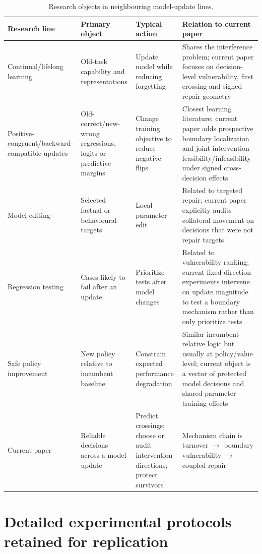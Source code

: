 \documentclass[11pt,letterpaper]{article}
\theoremstyle{plain}
\newcommand{\1}{\mathbf 1}
\begin{document}
\begin{table}[H]\centering\small
\caption{Research objects in neighbouring model-update lines.}\label{tab:s_neighbor_methods}
\begin{tabularx}{\textwidth}{p{}p{}p{}X}
\toprule
Research line & Primary object & Typical action & Relation to current paper\\
\midrule
Continual/lifelong learning & Old-task capability and representations & Update model while reducing forgetting & Shares the interference problem; current paper focuses on decision-level vulnerability, first crossing and signed repair geometry\\
Positive-congruent/backward-compatible updates & Old-correct/new-wrong regressions, logits or predictive margins & Change training objective to reduce negative flips & Closest learning literature; current paper adds prospective boundary localization and joint intervention feasibility/infeasibility under signed cross-decision effects\\
Model editing & Selected factual or behavioural targets & Local parameter edit & Related to targeted repair; current paper explicitly audits collateral movement on decisions that were not repair targets\\
Regression testing & Cases likely to fail after an update & Prioritize tests after model changes & Related to vulnerability ranking; current fixed-direction experiments intervene on update magnitude to test a boundary mechanism rather than only prioritize tests\\
Safe policy improvement & New policy relative to incumbent baseline & Constrain expected performance degradation & Similar incumbent-relative logic but usually at policy/value level; current object is a vector of protected model decisions and shared-parameter training effects\\
Current paper & Reliable decisions across a model update & Predict crossings; choose or audit intervention directions; protect survivors & Mechanism chain is turnover $\to$ boundary vulnerability $\to$ coupled repair\\
\bottomrule
\end{tabularx}
\end{table}

\section{Detailed experimental protocols retained for replication}
\end{document}
